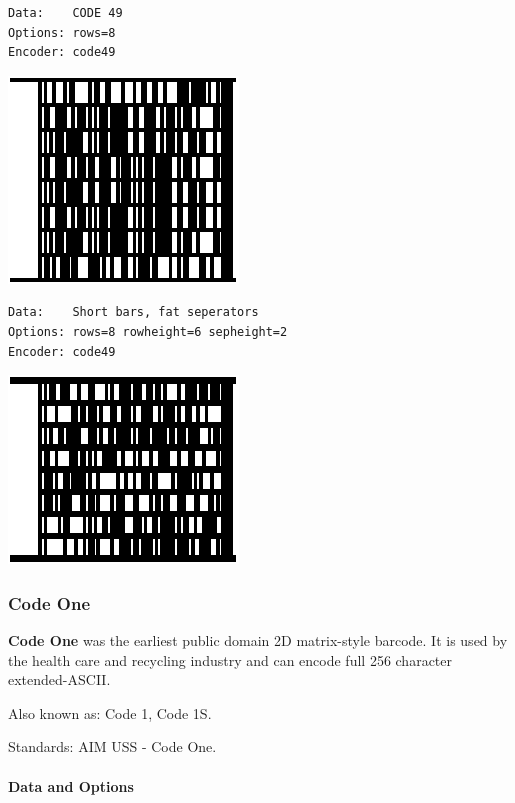 \begin{verbatim}
Data:    CODE 49
Options: rows=8
Encoder: code49
\end{verbatim}

\includegraphics{images/code49-2.eps}

\begin{verbatim}
Data:    Short bars, fat seperators
Options: rows=8 rowheight=6 sepheight=2
Encoder: code49
\end{verbatim}

\includegraphics{images/code49-3.eps}

\hypertarget{code-one}{%
\subsubsection{Code One}\label{code-one}}

\textbf{Code One} was the earliest public domain 2D matrix-style
barcode. It is used by the health care and recycling industry and can
encode full 256 character extended-ASCII.

Also known as: Code 1, Code 1S.

Standards: AIM USS - Code One.

\hypertarget{data-and-options-73}{%
\paragraph{Data and Options}\label{data-and-options-73}}

